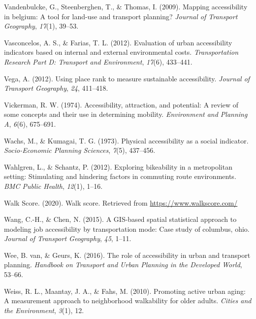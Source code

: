 \documentclass[
11pt, %
oneside, %
english, %
singlespacing, %
]{macthesis} %
\newlength{\cslhangindent}
\newenvironment{CSLReferences}[2] %
 {%
  \setlength{\parindent}{0pt}
  \ifodd #1 \everypar{\setlength{\hangindent}{\cslhangindent}}\ignorespaces\fi
  \ifnum #2 > 0
  \setlength{\parskip}{#2\baselineskip}
  \fi
 }%
 {}
\begin{document}
\begin{CSLReferences}{1}{0}
\leavevmode{}%
Vandenbulcke, G., Steenberghen, T., \& Thomas, I. (2009). Mapping accessibility in belgium: A tool for land-use and transport planning? \emph{Journal of Transport Geography}, \emph{17}(1), 39--53.

\leavevmode{}%
Vasconcelos, A. S., \& Farias, T. L. (2012). Evaluation of urban accessibility indicators based on internal and external environmental costs. \emph{Transportation Research Part D: Transport and Environment}, \emph{17}(6), 433--441.

\leavevmode{}%
Vega, A. (2012). Using place rank to measure sustainable accessibility. \emph{Journal of Transport Geography}, \emph{24}, 411--418.

\leavevmode{}%
Vickerman, R. W. (1974). Accessibility, attraction, and potential: A review of some concepts and their use in determining mobility. \emph{Environment and Planning A}, \emph{6}(6), 675--691.

\leavevmode{}%
Wachs, M., \& Kumagai, T. G. (1973). Physical accessibility as a social indicator. \emph{Socio-Economic Planning Sciences}, \emph{7}(5), 437--456.

\leavevmode{}%
Wahlgren, L., \& Schantz, P. (2012). Exploring bikeability in a metropolitan setting: Stimulating and hindering factors in commuting route environments. \emph{BMC Public Health}, \emph{12}(1), 1--16.

\leavevmode{}%
Walk Score. (2020). Walk score. Retrieved from \url{https://www.walkscore.com/}

\leavevmode{}%
Wang, C.-H., \& Chen, N. (2015). A GIS-based spatial statistical approach to modeling job accessibility by transportation mode: Case study of columbus, ohio. \emph{Journal of Transport Geography}, \emph{45}, 1--11.

\leavevmode{}%
Wee, B. van, \& Geurs, K. (2016). The role of accessibility in urban and transport planning. \emph{Handbook on Transport and Urban Planning in the Developed World}, 53--66.

\leavevmode{}%
Weiss, R. L., Maantay, J. A., \& Fahs, M. (2010). Promoting active urban aging: A measurement approach to neighborhood walkability for older adults. \emph{Cities and the Environment}, \emph{3}(1), 12.


\end{CSLReferences}
\end{document}

